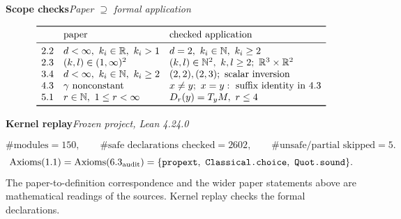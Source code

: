 \documentclass[11pt]{article}
\newcommand{\R}{\mathbb R}
\newcommand{\N}{\mathbb N}
\newcommand{\rowhead}[2]{\par\medskip\noindent\textbf{#1}\quad\textit{#2}\par}
\begin{document}
\rowhead{Scope checks}{Paper $\supseteq$ formal application}
\[
\begin{array}{lll}
\toprule
 & \text{paper} & \text{checked application}\\
\midrule
2.2 &d<\infty,\ k_i\in\R,\ k_i>1 & d=2,\ k_i\in\N,\ k_i\ge2\\
2.3 & (k,l)\in(1,\infty)^2 & (k,l)\in\N^2,\ k,l\ge2;\ \R^3\times\R^2\\
3.4 &d<\infty,\ k_i\in\N,\ k_i\ge2
       & (2,2),(2,3);\ \text{scalar inversion}\\
4.3 &\gamma\ \text{nonconstant} &x\ne y;\ x=y:\ \text{suffix identity in 4.3}\\
5.1 &r\in\N,\ 1\le r<\infty &D_r(y)=T_yM,\ r\le4\\
\bottomrule
\end{array}
\]
\rowhead{Kernel replay}{Frozen project, Lean 4.24.0}
\[
 \#\text{modules}=150,\qquad
 \#\text{safe declarations checked}=2602,\qquad
 \#\text{unsafe/partial skipped}=5 .
\]
\[
 \operatorname{Axioms}(1.1)=\operatorname{Axioms}(6.3_{\rm audit})
 =\{\texttt{propext},\ \texttt{Classical.choice},\ \texttt{Quot.sound}\}.
\]
The paper-to-definition correspondence and the wider paper statements
above are mathematical readings of the sources. Kernel replay checks the
formal declarations.
\end{document}
